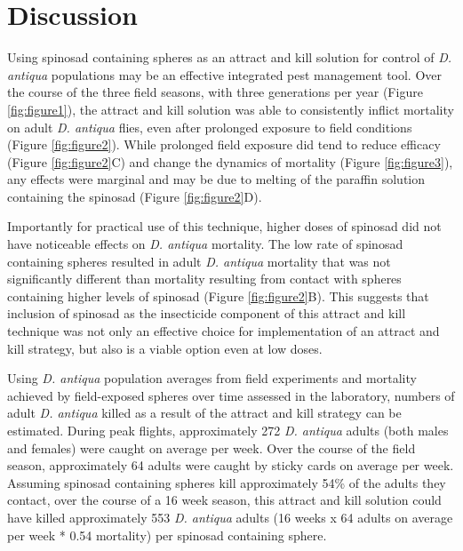 \documentclass[alpha-refs]{wiley-article}
\begin{document}
\section{Discussion}

Using spinosad containing spheres as an attract and kill solution for control of \textit{D. antiqua} populations may be an effective integrated pest management tool.  Over the course of the three field seasons, with three generations per year (Figure \ref{fig:figure1}), the attract and kill solution was able to consistently inflict mortality on adult \textit{D. antiqua} flies, even after prolonged exposure to field conditions (Figure \ref{fig:figure2}).  While prolonged field exposure did tend to reduce efficacy (Figure \ref{fig:figure2}C) and change the dynamics of mortality (Figure \ref{fig:figure3}), any effects were marginal and may be due to melting of the paraffin solution containing the spinosad (Figure \ref{fig:figure2}D).  

Importantly for practical use of this technique, higher doses of spinosad did not have noticeable effects on \textit{D. antiqua} mortality.  The low rate of spinosad containing spheres resulted in adult \textit{D. antiqua} mortality that was not significantly different than mortality resulting from contact with spheres containing higher levels of spinosad (Figure \ref{fig:figure2}B).  This suggests that inclusion of spinosad as the insecticide component of this attract and kill technique was not only an effective choice for implementation of an attract and kill strategy, but also is a viable option even at low doses.  

Using \textit{D. antiqua} population averages from field experiments and mortality achieved by field-exposed spheres over time assessed in the laboratory, numbers of adult \textit{D. antiqua}  killed as a result of the attract and kill strategy can be estimated. During peak flights, approximately 272 \textit{D. antiqua} adults (both males and females) were caught on average per week.  Over the course of the field season, approximately 64 adults were caught by sticky cards on average per week.  Assuming spinosad containing spheres kill approximately 54\% of the adults they contact, over the course of a 16 week season, this attract and kill solution could have killed approximately 553 \textit{D. antiqua} adults (16 weeks x 64 adults on average per week * 0.54 mortality) per spinosad containing sphere.  
\end{document}
